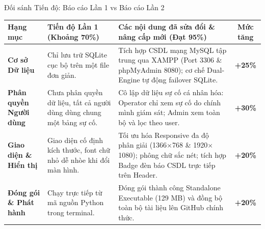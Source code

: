 \documentclass[aspectratio=169, 11pt]{beamer}
\newcommand{\code}[1]{\leavevmode{\ttfamily\color{DarkMain}#1}}
\begin{document}
\begin{frame}{Đối sánh Tiến độ: Báo cáo Lần 1 vs Báo cáo Lần 2}
  \vspace{-0.15cm}
  \renewcommand{\arraystretch}{1.28}
  \fontsize{7.6pt}{9.8pt}\selectfont
  \centering
  \begin{tabularx}{\textwidth}{@{} p{2.8cm} p{4.2cm} X c @{}}
    \toprule[1.0pt]
    \textbf{Hạng mục} & \textbf{Tiến độ Lần 1 (Khoảng 70\%)} & \textbf{Các nội dung đã sửa đổi \& nâng cấp mới (Đạt 95\%)} & \textbf{Mức tăng} \\
    \midrule[0.6pt]
    \textbf{Cơ sở Dữ liệu} &
    Chỉ lưu trữ SQLite cục bộ trên một file \code{.db} đơn giản. &
    Tích hợp CSDL mạng MySQL tập trung qua XAMPP (Port 3306 \& phpMyAdmin 8080); cơ chế Dual-Engine tự động failover SQLite. &
    \textbf{+25\%} \\
    \midrule[0.3pt]

    \textbf{Phân quyền Người dùng} &
    Chưa phân quyền dữ liệu, tất cả người dùng dùng chung một bảng sự cố. &
    Cô lập dữ liệu sự cố cá nhân hóa: Operator chỉ xem sự cố do chính mình giám sát; Admin xem toàn bộ và lọc theo user. &
    \textbf{+30\%} \\
    \midrule[0.3pt]

    \textbf{Giao diện \& Hiển thị} &
    Giao diện cố định kích thước, font chữ nhỏ dễ nhòe khi đổi màn hình. &
    Tối ưu hóa Responsive đa độ phân giải (1366$\times$768 \& 1920$\times$1080); phông chữ sắc nét; tích hợp Badge đèn báo CSDL trực tiếp trên Header. &
    \textbf{+20\%} \\
    \midrule[0.3pt]

    \textbf{Đóng gói \& Phát hành} &
    Chạy trực tiếp từ mã nguồn Python trong terminal. &
    Đóng gói thành công Standalone Executable \code{GiamSatGiaoThong.exe} (129 MB) và đồng bộ toàn bộ tài liệu lên GitHub chính thức. &
    \textbf{+20\%} \\
    \bottomrule[1.0pt]
  \end{tabularx}
\end{frame}
\end{document}
